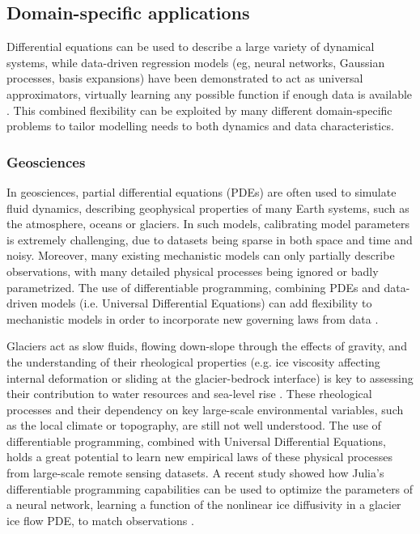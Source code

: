 \subsection{Domain-specific applications}

Differential equations can be used to describe a large variety of dynamical systems, while data-driven regression models (eg, neural networks, Gaussian processes, basis expansions) have been demonstrated to act as universal approximators, virtually learning any possible function if enough data is available \cite{gorban_1998}. 
This combined flexibility can be exploited by many different domain-specific problems to tailor modelling needs to both dynamics and data characteristics.

\subsubsection{Geosciences}

In geosciences, partial differential equations (PDEs) are often used to simulate fluid dynamics, describing geophysical properties of many Earth systems, such as the atmosphere, oceans or glaciers.
In such models, calibrating model parameters is extremely challenging, due to datasets being sparse in both space and time and noisy.
Moreover, many existing mechanistic models can only partially describe observations, with many detailed physical processes being ignored or badly parametrized. 
The use of differentiable programming, combining PDEs and data-driven models (i.e. Universal Differential Equations) can add flexibility to mechanistic models in order to incorporate new governing laws from data \cite{rackauckas2020universal}.


Glaciers act as slow fluids, flowing down-slope through the effects of gravity, and the understanding of their rheological properties (e.g. ice viscosity affecting internal deformation or sliding at the glacier-bedrock interface) is key to assessing their contribution to water resources and sea-level rise \cite{cuffey_physics_2010}. 
These rheological processes and their dependency on key large-scale environmental variables, such as the local climate or topography, are still not well understood.
The use of differentiable programming, combined with Universal Differential Equations, holds a great potential to learn new empirical laws of these physical processes from large-scale remote sensing datasets. 
A recent study showed how Julia's differentiable programming capabilities can be used to optimize the parameters of a neural network, learning a function of the nonlinear ice diffusivity in a glacier ice flow PDE, to match observations \cite{bolibar_universal_2023} .
